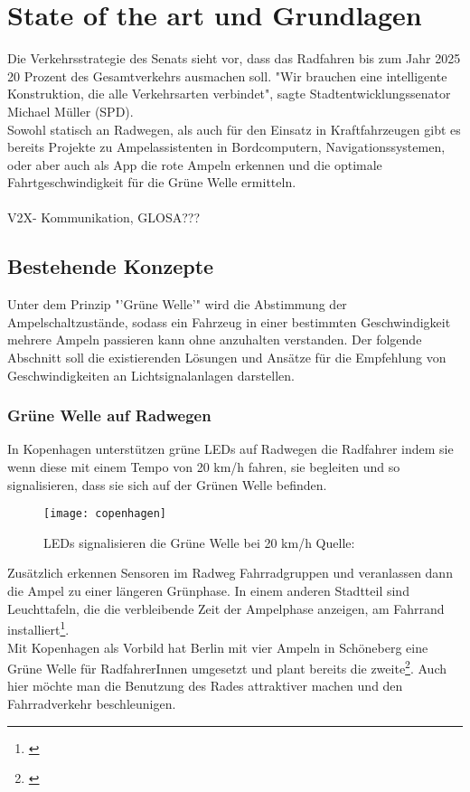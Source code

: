\chapter{State of the art und Grundlagen}
Die Verkehrsstrategie des Senats sieht vor, dass das Radfahren bis zum Jahr 2025 20 Prozent des Gesamtverkehrs ausmachen soll. \cite{Mopo}
"Wir brauchen eine intelligente Konstruktion, die alle Verkehrsarten verbindet", sagte Stadtentwicklungssenator Michael Müller (SPD).\\
Sowohl statisch an Radwegen, als auch für den Einsatz in Kraftfahrzeugen gibt es bereits Projekte zu Ampelassistenten in Bordcomputern, Navigationssystemen, oder aber auch als App die rote Ampeln erkennen und die optimale Fahrtgeschwindigkeit für die Grüne Welle ermitteln.\\\\
\gls{V2X}- Kommunikation, GLOSA???\\
\section{Bestehende Konzepte}
Unter dem Prinzip "'Grüne Welle'" wird die Abstimmung der Ampelschaltzustände, sodass ein Fahrzeug in einer bestimmten Geschwindigkeit mehrere Ampeln passieren kann ohne anzuhalten verstanden. Der folgende Abschnitt soll die existierenden Lösungen und Ansätze für die Empfehlung von Geschwindigkeiten an Lichtsignalanlagen darstellen.
\subsection{Grüne Welle auf Radwegen}
In Kopenhagen unterstützen grüne \gls{LED}s auf Radwegen die Radfahrer indem sie wenn diese mit einem Tempo von 20 km/h fahren, sie begleiten und so signalisieren, dass sie sich auf der Grünen Welle befinden. 
\begin{figure}[H]  
    \centering  
    \texttt{[image: copenhagen]}
    \label{fig:copenhagen}
    \caption[Grüne Welle durch \gls{LED}s]{\gls{LED}s signalisieren die Grüne Welle bei 20 km/h  Quelle: \cite{NYT}}
\end{figure}
Zusätzlich erkennen Sensoren im Radweg Fahrradgruppen und veranlassen dann die Ampel zu einer längeren Grünphase. In einem anderen Stadtteil sind Leuchttafeln, die die verbleibende Zeit der Ampelphase anzeigen, am Fahrrand installiert\footnote{\cite{KopIng}}.\\
Mit Kopenhagen als Vorbild hat Berlin mit vier Ampeln in Schöneberg eine Grüne Welle für RadfahrerInnen umgesetzt und plant bereits die zweite\footnote{\cite{BZ}}. Auch hier möchte man die Benutzung des Rades attraktiver machen und den Fahrradverkehr beschleunigen.
